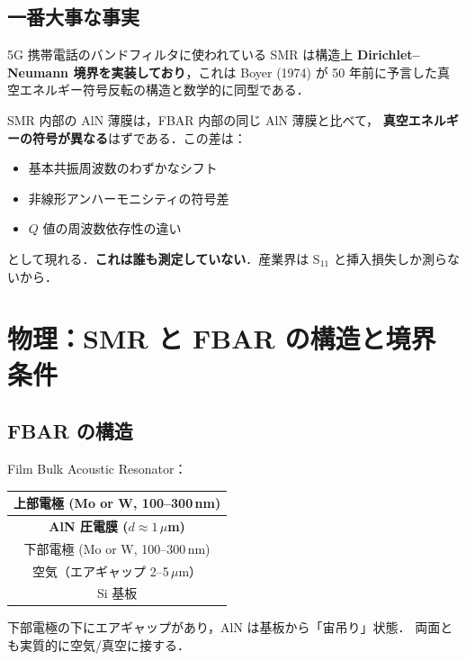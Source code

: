 \documentclass[11pt,a4paper]{article}
\begin{document}
\subsection{一番大事な事実}

5G 携帯電話のバンドフィルタに使われている SMR は構造上
\textbf{Dirichlet--Neumann 境界を実装しており}，これは Boyer (1974) が
50 年前に予言した真空エネルギー符号反転の構造と数学的に同型である．

\begin{tcolorbox}[colback=yellow!10,colframe=orange!60!black,title=もし我々の仮説が正しいなら]
SMR 内部の AlN 薄膜は，FBAR 内部の同じ AlN 薄膜と比べて，
\textbf{真空エネルギーの符号が異なる}はずである．この差は：
\begin{itemize}
\item 基本共振周波数のわずかなシフト
\item 非線形アンハーモニシティの符号差
\item $Q$ 値の周波数依存性の違い
\end{itemize}
として現れる．\textbf{これは誰も測定していない}．産業界は
S$_{11}$ と挿入損失しか測らないから．
\end{tcolorbox}

\section{物理：SMR と FBAR の構造と境界条件}

\subsection{FBAR の構造}

Film Bulk Acoustic Resonator：

\begin{center}
\begin{tabular}{|c|}
\hline
上部電極 (Mo or W, 100--300\,nm) \\
\hline
\textbf{AlN 圧電膜 ($d \approx 1\,\mu$m)} \\
\hline
下部電極 (Mo or W, 100--300\,nm) \\
\hline
空気（エアギャップ 2--5\,$\mu$m）\\
\hline
Si 基板 \\
\hline
\end{tabular}
\end{center}

下部電極の下にエアギャップがあり，AlN は基板から「宙吊り」状態．
両面とも実質的に空気/真空に接する．
\end{document}
